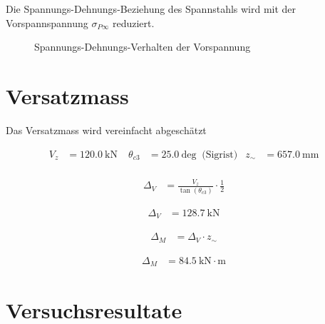 \documentclass[
  11pt,
  letterpaper,
]{scrreprt}
\begin{document}
Die Spannungs-Dehnungs-Beziehung des Spannstahls wird mit der
Vorspannspannung \(\sigma_{P\infty}\) reduziert.

\begin{figure}[H]


\caption{\label{fig-sigma_eps_vorspannung_t6}Spannungs-Dehnungs-Verhalten
der Vorspannung}

\end{figure}%

\section{Versatzmass}\label{versatzmass-1}

Das Versatzmass wird vereinfacht abgeschätzt

$$
\begin{aligned}
V_{z} &= 120.0\ \mathrm{kN} \; 
 &\theta_{c3} &= 25.0\ \mathrm{deg} \; \;\textrm{(Sigrist)}
 &z_{\sim} &= 657.0\ \mathrm{mm} \; 
\\[10pt]
\end{aligned}
$$

$$
\begin{aligned}
\Delta_{V} &= \frac{ V_{z} }{ \tan \left( \theta_{c3} \right) } \cdot \frac{1} { 2 } \; 
\end{aligned}
$$

$$
\begin{aligned}
\Delta_{V} &= 128.7\ \mathrm{kN} \;
\end{aligned}
$$

$$
\begin{aligned}
\Delta_{M} &= \Delta_{V} \cdot z_{\sim} \; 
\end{aligned}
$$

$$
\begin{aligned}
\Delta_{M} &= 84.5\ \mathrm{kN} \cdot \mathrm{m} \;
\end{aligned}
$$

\section{Versuchsresultate}\label{versuchsresultate}
\end{document}

